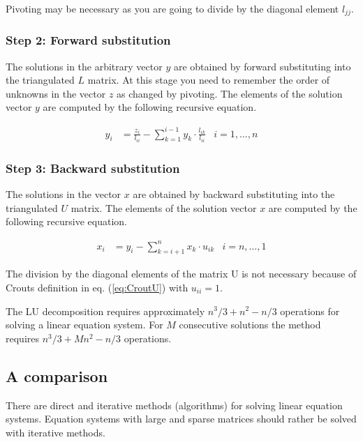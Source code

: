 \documentclass[10pt]{report}
\begin{document}
Pivoting may be necessary as you are going to divide by the diagonal
element $l_{jj}$.

\subsubsection{Step 2: Forward substitution}

The solutions in the arbitrary vector $y$ are obtained by forward
substituting into the triangulated $L$ matrix.  At this stage you need
to remember the order of unknowns in the vector $z$ as changed by
pivoting.  The elements of the solution vector $y$ are computed by the
following recursive equation.

\begin{align}
y_{i} &= \frac{z_{i}}{l_{ii}} - \sum_{k=1}^{i-1} y_{k}\cdot \frac{l_{ik}}{l_{ii}} & i = 1,\ldots,n
\end{align}

\subsubsection{Step 3: Backward substitution}

The solutions in the vector $x$ are obtained by backward substituting
into the triangulated $U$ matrix.  The elements of the solution vector
$x$ are computed by the following recursive equation.

\begin{align}
x_{i} &= y_{i} - \sum_{k=i+1}^{n} x_{k}\cdot u_{ik} & i = n,\ldots,1
\end{align}

The division by the diagonal elements of the matrix U is not necessary
because of Crouts definition in eq. (\ref{eq:CroutU}) with $u_{ii} =
1$.

\addvspace{12pt}

The LU decomposition requires approximately $n^3/3 + n^2 - n/3$
operations for solving a linear equation system.  For $M$ consecutive
solutions the method requires $n^3/3 + Mn^2 - n/3$ operations.

\subsection{A comparison}

There are direct and iterative methods (algorithms) for solving linear
equation systems.  Equation systems with large and sparse matrices
should rather be solved with iterative methods.
\end{document}
